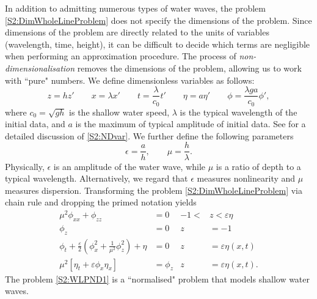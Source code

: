 In addition to admitting numerous types of water waves, the problem \eqref{S2:DimWholeLineProblem} does not specify the dimensions of the problem. Since dimensions of the problem are directly related to the units of variables (wavelength, time, height), it can be difficult to decide which terms are negligible when performing an approximation procedure. The process of \textit{non-dimensionalisation} removes the dimensions of the problem, allowing us to work with ``pure" numbers. We define dimensionless variables as follows:
\begin{equation}\label{S2:NDvar}
z = hz' \qquad x = \lambda x' \qquad t = \frac{\lambda}{c_0}t' \qquad \eta = a \eta' \qquad \phi = \frac{\lambda g a}{c_0} \phi',
\end{equation}
where $c_0 = \sqrt{gh}$ is the shallow water speed, $\lambda$ is the typical wavelength of the initial data, and $a$ is the maximum of typical amplitude of initial data. See \cite[Sections 1.3.2-1.3.3]{Lannes} for a detailed discussion of \eqref{S2:NDvar}. We further define the following parameters 
\[ \epsilon = \frac{a}{h}, \qquad \mu = \frac{h}{\lambda}.\]
Physically, $\epsilon$ is an amplitude of the water wave, while $\mu$ is a ratio of depth to a typical wavelength. Alternatively, we regard that $\epsilon$ measures nonlinearity and $\mu$ measures dispersion. Transforming the problem \eqref{S2:DimWholeLineProblem} via chain rule and dropping the primed notation yields
\begin{subequations}\label{S2:WLPND1}
\begin{align}
\label{S2:PDEND1}  \mu^2 \phi_{xx} + \phi_{zz} &= 0 &-1 <&z < \varepsilon\eta \\
\label{S2:BC1ND1} \phi_z &= 0 &z &= -1  \\ 
\label{S2:BC2ND1} \phi_{t} + \frac{\varepsilon}{2} \left(\phi_{x}^2 + \frac{1}{\mu^2}\phi_{z}^2\right) + \eta &= 0 &z &= \varepsilon\eta(x,t)\\
\label{S2:BC3ND1} \mu^2 \left[\eta_{t} + \varepsilon \phi_{x} \eta_{x}\right] &= \phi_{z} &z &= \varepsilon\eta(x,t).
\end{align}
\end{subequations}
The problem \eqref{S2:WLPND1} is a ``normalised" problem that models shallow water waves.

